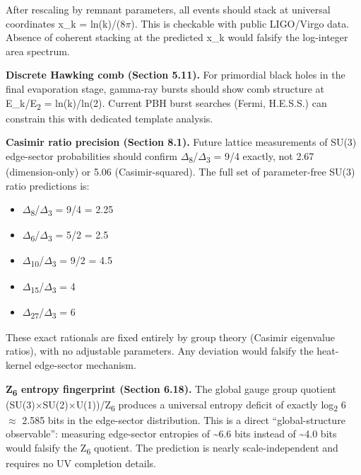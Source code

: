\documentclass[11pt,a4paper]{article}
\theoremstyle{remark}
\providecommand{\tightlist}{%
  \setlength{\itemsep}{0pt}\setlength{\parskip}{0pt}}
\begin{document}
After rescaling by remnant parameters, all events should stack at universal coordinates x\_k = ln(k)/(8\ensuremath{\pi}). This is checkable with public LIGO/Virgo data. Absence of coherent stacking at the predicted x\_k would falsify the log-integer area spectrum.

\textbf{Discrete Hawking comb (Section 5.11).} For primordial black holes in the final evaporation stage, gamma-ray bursts should show comb structure at E\_k/E\textsubscript{2} = ln(k)/ln(2). Current PBH burst searches (Fermi, H.E.S.S.) can constrain this with dedicated template analysis.

\textbf{Casimir ratio precision (Section 8.1).} Future lattice measurements of SU(3) edge-sector probabilities should confirm \ensuremath{\Delta}\textsubscript{8}/\ensuremath{\Delta}\textsubscript{3} = 9/4 exactly, not 2.67 (dimension-only) or 5.06 (Casimir-squared). The full set of parameter-free SU(3) ratio predictions is:

\begin{itemize}
\tightlist
\item
  \ensuremath{\Delta}\textsubscript{8}/\ensuremath{\Delta}\textsubscript{3} = 9/4 = 2.25
\item
  \ensuremath{\Delta}\textsubscript{6}/\ensuremath{\Delta}\textsubscript{3} = 5/2 = 2.5
\item
  \ensuremath{\Delta}\textsubscript{10}/\ensuremath{\Delta}\textsubscript{3} = 9/2 = 4.5
\item
  \ensuremath{\Delta}\textsubscript{15}/\ensuremath{\Delta}\textsubscript{3} = 4
\item
  \ensuremath{\Delta}\textsubscript{27}/\ensuremath{\Delta}\textsubscript{3} = 6
\end{itemize}

These exact rationals are fixed entirely by group theory (Casimir eigenvalue ratios), with no adjustable parameters. Any deviation would falsify the heat-kernel edge-sector mechanism.

\textbf{Z\textsubscript{6} entropy fingerprint (Section 6.18).} The global gauge group quotient (SU(3)\ensuremath{\times}SU(2)\ensuremath{\times}U(1))/Z\textsubscript{6} produces a universal entropy deficit of exactly log\textsubscript{2} 6 \ensuremath{\approx} 2.585 bits in the edge-sector distribution. This is a direct ``global-structure observable'': measuring edge-sector entropies of \textasciitilde6.6 bits instead of \textasciitilde4.0 bits would falsify the Z\textsubscript{6} quotient. The prediction is nearly scale-independent and requires no UV completion details.
\end{document}
